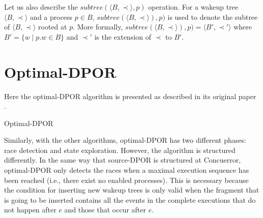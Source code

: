 Let us also describe the $subtree(\langle B , \prec \rangle, p)$ operation. For a wakeup tree $\langle B , \prec \rangle$
and a process  $p \in B$, $subtree(\langle B , \prec \rangle), p)$ is used to denote the
subtree of $\langle B , \prec \rangle$ rooted at $p$. More formally, $subtree(\langle B , \prec \rangle), p) 
= \langle B' , \prec' \rangle$ where $B' = \{w \mid p.w \in B \}$ and $\prec'$ is the extension of $\prec$ to $B'$.

\section{Optimal-DPOR} 

Here the optimal-DPOR algorithm is presented as described in its original paper \cite{AbdullaAronisJohnssonSagonasDPOR2014}.

\begin{algorithm}
    \caption{Optimal-DPOR}
    \label{optimal}
\end{algorithm}

Similarly, with the other algorithms, optimal-DPOR has two different phases: race detection and state exploration. 
However, the algorithm is structured differently. In the same way that source-DPOR is structured at Concuerror,
optimal-DPOR only detects the races when a maximal execution sequence has been reached (i.e., there exist no
enabled processes). This is necessary because the condition for inserting new wakeup trees is only
valid when the fragment that is going to be inserted contains all the events in the complete executions that 
do not happen after $e$ and those that occur after $e$.

